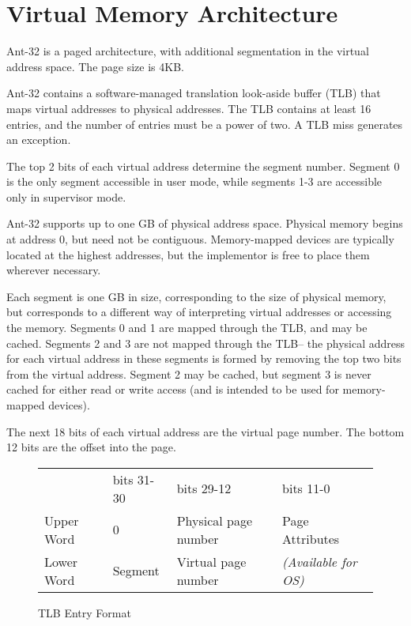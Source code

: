 
\chapter{Virtual Memory Architecture}
\label{VirtualMemoryArchitecture}

Ant-32 is a paged architecture, with additional segmentation in the
virtual address space.  The page size is 4KB.

Ant-32 contains a software-managed translation look-aside buffer (TLB)
that maps virtual addresses to physical addresses.  The TLB contains
at least 16 entries, and the number of entries must be a power of two. 
A TLB miss generates an exception.

The top 2 bits of each virtual address determine the segment number.
Segment 0 is the only segment accessible in user mode, while
segments 1-3 are accessible only in supervisor mode.

Ant-32 supports up to one GB of physical address space.  Physical
memory begins at address 0, but need not be contiguous.  Memory-mapped
devices are typically located at the highest addresses, but the
implementor is free to place them wherever necessary.

Each segment is one GB in size, corresponding to the size of physical
memory, but corresponds to a different way of interpreting virtual
addresses or accessing the memory.  Segments 0 and 1 are mapped
through the TLB, and may be cached.  Segments 2 and 3 are not mapped
through the TLB-- the physical address for each virtual address in
these segments is formed by removing the top two bits from the virtual
address.  Segment 2 may be cached, but segment 3 is never cached for
either read or write access (and is intended to be used for
memory-mapped devices).

The next 18 bits of each virtual address are the virtual page number. 
The bottom 12 bits are the offset into the page.

\begin{figure}[ht]
\caption{TLB Entry Format}

\begin{center}
\begin{tabular}{l|p{0.7in}|p{2.5in}|p{1.2in}|}
\cline{2-4}
		& bits 31-30 & bits 29-12	& bits 11-0 \\
\cline{2-4}
Upper Word	& 0	& Physical page	number	& Page Attributes \\
\cline{2-4}
Lower Word	& Segment & Virtual page number	& {\em (Available for OS)} \\
\cline{2-4}
\end{tabular}
\end{center}
\end{figure}

